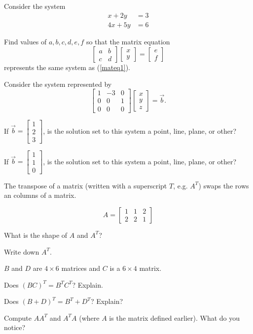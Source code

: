 \documentclass{article}
\newcommand{\mat}[1]{\begin{bmatrix}#1\end{bmatrix}}
\begin{document}
	Consider the system
	\begin{equation}\label{mateq1}
		\begin{array}{ll}
			x+2y &= 3\\
			4x+5y &= 6
		\end{array}
	\end{equation}

	\begin{Enum}
		\item Find values of $a,b,c,d,e,f$ so that the matrix equation
		\[
			\mat{a&b\\c&d}\mat{x\\y}=\mat{e\\f}
		\]
		represents the same system as (\ref{mateq1}).
	\end{Enum}

	Consider the system represented by
	\[
		\mat{1&-3&0\\0&0&1\\0&0&0}\mat{x\\y\\z}=\vec b.
	\]
	\begin{Enum}[resume]
		\item If $\vec b=\mat{1\\2\\3}$, is the solution set to this system a 
		point, line, plane, or other?
		\item If $\vec b=\mat{1\\1\\0}$, is the solution set to this system a 
		point, line, plane, or other?
	\end{Enum}

	The transpose of a matrix (written with a superscript $T$, e.g. $A^T$) swaps
	the rows an columns of a matrix.

	\[
		A=\mat{1&1&2\\2&2&1}
	\]
	\begin{Enum}
		\item What is the shape of $A$ and $A^T$?
		\item Write down $A^T$.
	\end{Enum}

	$B$ and $D$ are $4\times 6$ matrices and $C$ is a $6\times 4$ matrix.

	\begin{Enum}[resume]
		\item Does $(BC)^T=B^TC^T$? Explain.
		\item Does $(B+D)^T=B^T+D^T$? Explain?
		\item Compute $AA^T$ and $A^TA$ (where $A$ is the matrix defined earlier).
		What do you notice?
	\end{Enum}
\end{document}
